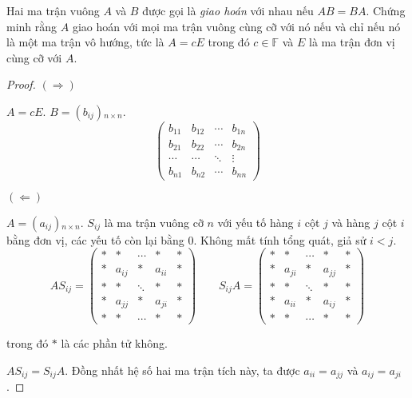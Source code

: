 \documentclass[class=linearalgebra,crop=false]{standalone}
\begin{document}
\begin{exercise}
    Hai ma trận vuông $A$ và $B$ được gọi là \textit{giao hoán} với nhau nếu $AB = BA$. Chứng minh rằng $A$ giao hoán với mọi ma trận vuông cùng cỡ với nó nếu và chỉ nếu nó là một ma trận vô hướng, tức là $A = cE$ trong đó $c\in\mathbb{F}$ và $E$ là ma trận đơn vị cùng cỡ với $A$.
\end{exercise}

\begin{proof}
    $(\Rightarrow)$
    \par $A = cE$. $B = (b_{ij}){}_{n\times n}$.
    \[
        \begin{pmatrix}
            b_{11} & b_{12} & \cdots & b_{1n} \\
            b_{21} & b_{22} & \cdots & b_{2n} \\
            \cdots & \cdots & \ddots & \vdots \\
            b_{n1} & b_{n2} & \cdots & b_{nn}
        \end{pmatrix}
    \]
    \par $(\Leftarrow)$
    \par $A = (a_{ij}){}_{n\times n}$. $S_{ij}$ là ma trận vuông cỡ $n$ với yếu tố hàng $i$ cột $j$ và hàng $j$ cột $i$ bằng đơn vị, các yếu tố còn lại bằng $0$. Không mất tính tổng quát, giả sử $i < j$.
    \[
        AS_{ij} =
        \begin{pmatrix}
            * & *      & \cdots & *      & * \\
            * & a_{ij} & *      & a_{ii} & * \\
            * & *      & \ddots & *      & * \\
            * & a_{jj} & *      & a_{ji} & * \\
            * & *      & \cdots & *      & *
        \end{pmatrix}
        \qquad
        S_{ij}A =
        \begin{pmatrix}
            * & *      & \cdots & *      & * \\
            * & a_{ji} & *      & a_{jj} & * \\
            * & *      & \ddots & *      & * \\
            * & a_{ii} & *      & a_{ij} & * \\
            * & *      & \cdots & *      & *
        \end{pmatrix}
    \]
    \par trong đó $*$ là các phần tử không.
    \par $AS_{ij} = S_{ij}A$. Đồng nhất hệ số hai ma trận tích này, ta được $a_{ii} = a_{jj}$ và $a_{ij} = a_{ji}$.

\end{proof}
\end{document}
